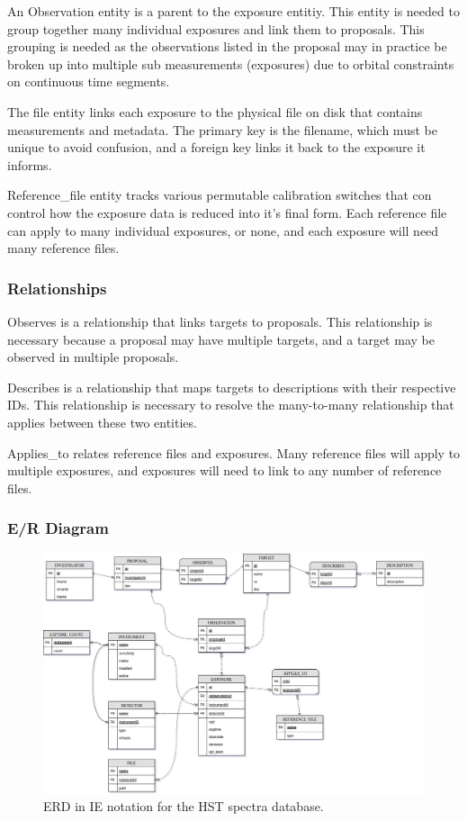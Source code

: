 \documentclass[a4paper,11pt]{article}
\begin{document}
An Observation entity is a parent to the exposure entitiy. This entity is needed to group together many individual exposures and link them to proposals.  This grouping is needed as the observations listed in the proposal may in practice be broken up into multiple sub measurements (exposures) due to orbital constraints on continuous time segments.  

The file entity links each exposure to the physical file on disk that contains measurements and metadata. The primary key is the filename, which must be unique to avoid confusion, and a foreign key links it back to the exposure it informs.

Reference\_file entity tracks various permutable calibration switches that con control how the exposure data is reduced into it's final form.  Each reference file can apply to many individual exposures, or none, and each exposure will need many reference files.  

\subsubsection{Relationships}
Observes is a relationship that links targets to proposals.  This relationship is necessary because a proposal may have multiple targets, and a target may be observed in multiple proposals.  

Describes is a relationship that maps targets to descriptions with their respective IDs.  This relationship is necessary to resolve the many-to-many relationship that applies between these two entities.  

Applies\_to relates reference files and exposures.  Many reference files will apply to multiple exposures, and exposures will need to link to any number of reference files.  

\subsubsection{E/R Diagram}

\begin{figure}[h!]
\caption{ERD in IE notation for the HST spectra database.}
\centering
\includegraphics[width=.9\textwidth]{hst_spectra_erd.png}
\end{figure}
\end{document}
